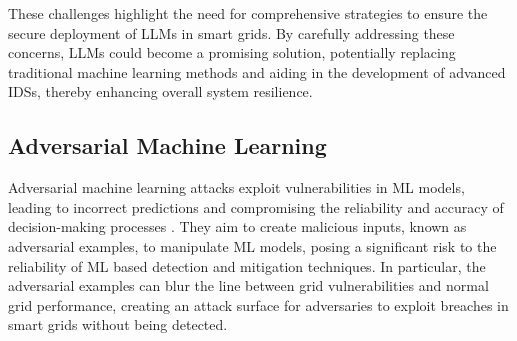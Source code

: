 \documentclass[10pt, journal]{IEEEtran}
\begin{document}
These challenges highlight the need for comprehensive strategies to ensure the secure deployment of LLMs in smart grids. By carefully addressing these concerns, LLMs could become a promising solution, potentially replacing traditional machine learning methods and aiding in the development of advanced IDSs, thereby enhancing overall system resilience. %



\subsection{Adversarial Machine Learning}

Adversarial machine learning attacks exploit vulnerabilities in ML models, leading to incorrect predictions and compromising the reliability and accuracy of decision-making processes \cite{goodfellow2014explaining}. They aim to create malicious inputs, known as adversarial examples, to manipulate ML models, posing a significant risk to the reliability of ML based detection and mitigation techniques. In particular, the adversarial examples can blur the line between grid vulnerabilities and normal grid performance, creating an attack surface for adversaries to exploit breaches in smart grids without being detected. 

\end{document}
